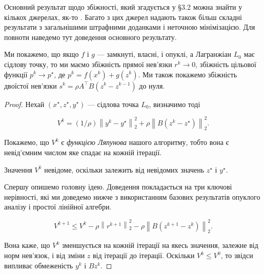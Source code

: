 Основний результат щодо збіжності, який згадується у \S3.2 можна знайти у кількох джерелах, як-то \cite{81, 63}. Багато з цих джерел надають також більш складні результати з загальнішими штрафними доданками і неточною мінімізацією. Для повноти наведемо тут доведення основного результату. 

\begin{theorem*}
    Ми покажемо, що якщо $f$ і $g$ --- замкнуті, власні, і опуклі, а Лагранжіан $L_0$ має сідлову точку, то ми маємо збіжність прямої нев'язки $r^k \to 0$, збіжність цільової функції $p^k \to p^\star$, де $p^k = f \left(x^k\right) + g \left(z^k\right)$. Ми також покажемо збіжність двоїстої нев'язки $s^k = \rho A^\intercal B \left(z^k - z^{k - 1}\right)$ до нуля.
\end{theorem*}

\begin{proof}
    Нехай $\left(x^\star, z^\star, y^\star\right)$ --- сідлова точка $L_0$, визначимо тоді

    \begin{equation*}
        V^k = (1/\rho) \left\| y^k - y^\star \right\|_2^2 + \rho \left\| B \left( z^k - z^\star \right) \right\|_2^2.
    \end{equation*}

    Покажемо, що $V^k$ є \textit{функцією Ляпунова} нашого алгоритму, тобто вона є невід'ємним числом яке спадає на кожній ітерації.

    \begin{remark}
        Значення $V^k$ невідоме, оскільки залежить від невідомих значень $z^\star$ і $y^\star$.
    \end{remark}

    Спершу опишемо головну ідею. Доведення покладається на три ключові нерівності, які ми доведемо нижче з використанням базових результатів опуклого аналізу і простої лінійної алгебри. 

    \begin{lemma*}
        \begin{equation}
            \label{eq:a1}
            V^{k + 1} \le V^k - \rho \left\| r^{k + 1} \right\|_2^2 - \rho \left\| B \left( z^{k + 1} - z^k \right) \right\|_2^2.
        \end{equation}
    \end{lemma*}

    Вона каже, що $V^k$ зменшується на кожній ітерації на якесь значення, залежне від норм нев'язок, і від зміни $z$ від ітерації до ітерації. Оскільки $V^k \le V^0$, то звідси випливає обмеженість $y^k$ і $B z^k$. \medskip


\end{proof}
